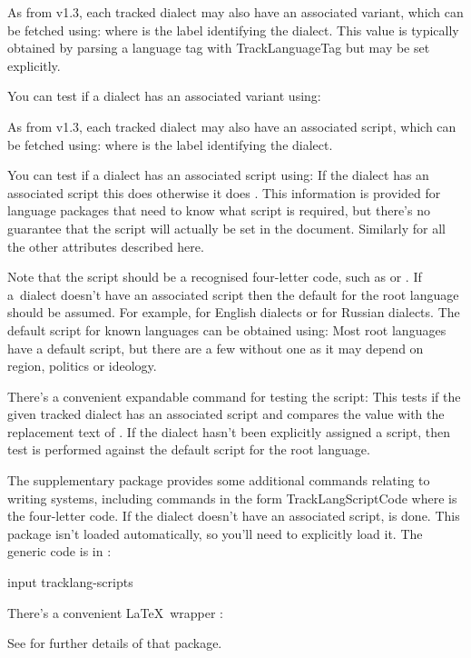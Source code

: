 \documentclass[titlepage=false,oneside,
 fontsize=12pt,captions=tableheading]{scrbook}
\begin{document}
As from v1.3, each tracked dialect may also have an associated 
variant, which can be fetched using:
where  is the label identifying the dialect.
This value is typically obtained by parsing a language tag
with \gls{TrackLanguageTag} but may be set explicitly.

You can test if a dialect has an associated variant using:

As from v1.3, each tracked dialect may also have an associated 
script, which can be fetched using:
where  is the label identifying the dialect.

You can test if a dialect has an associated script using:
If the dialect has an associated script this does 
otherwise it does . This information is provided
for language packages that need to know what script is required,
but there's no guarantee that the script will actually be set
in the document. Similarly for all the other attributes described
here.

Note that the script should be a recognised four-letter 
code, such as  or . If a~dialect
doesn't have an associated script then the default for the root
language should be assumed. For example,  for English dialects or
 for Russian dialects. The default script for
known languages can be obtained using:
Most root languages have a default script, but there
are a few without one as it may depend on region, politics
or ideology.

There's a convenient expandable command for testing the script:
This tests if the given tracked dialect has an associated script and
compares the value with the replacement text of .
If the dialect hasn't been explicitly assigned a script,
then test is performed against the default script for the root
language.

The supplementary package  provides some
additional commands relating to writing systems, including commands 
in the form \gls{TrackLangScriptCode} where
 is the  four-letter code. If the dialect
doesn't have an associated script,  is done.
This package isn't
loaded automatically, so you'll need to explicitly load it. The
generic code is in :
\begin{codebox}
\gls{input} tracklang-scripts
\end{codebox}
There's a convenient \LaTeX\ wrapper :
\begin{codebox}
\end{codebox}
See  for further details of
that package.
\end{document}
